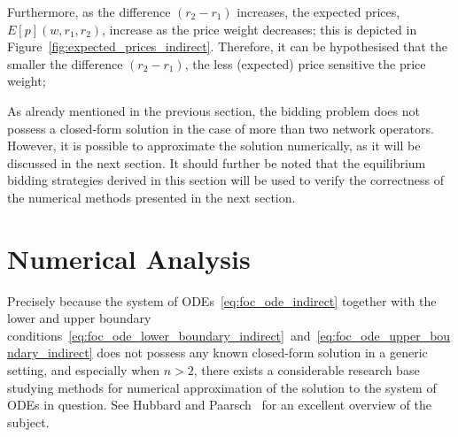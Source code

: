 Furthermore, as the difference $(r_2-r_1)$ increases, the expected prices, $E[p](w,r_1,r_2)$, increase as the price weight decreases; this is depicted in Figure~\ref{fig:expected_prices_indirect}. Therefore, it can be hypothesised that the smaller the difference $(r_2-r_1)$, the less (expected) price sensitive the price weight;  

As already mentioned in the previous section, the bidding problem does not possess a closed-form solution in the case of more than two network operators. However, it is possible to approximate the solution numerically, as it will be discussed in the next section. It should further be noted that the equilibrium bidding strategies derived in this section will be used to verify the correctness of the numerical methods presented in the next section.

\section{Numerical Analysis} %
\label{sec:numerical_analysis_indirect}
Precisely because the system of ODEs~\eqref{eq:foc_ode_indirect} together with the lower and upper boundary conditions~\eqref{eq:foc_ode_lower_boundary_indirect}~and~\eqref{eq:foc_ode_upper_boundary_indirect} does not possess any known closed-form solution in a generic setting, and especially when $n>2$, there exists a considerable research base studying methods for numerical approximation of the solution to the system of ODEs in question. See Hubbard and Paarsch~\cite{HubbardPaarsch2011} for an excellent overview of the subject.

